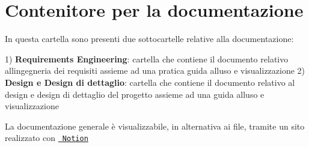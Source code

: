 \chapter{Contenitore per la documentazione}
\hypertarget{md_docs_2readme}{}\label{md_docs_2readme}
\label{md_docs_2readme_autotoc_md2}%
%


In questa cartella sono presenti due sottocartelle relative alla documentazione\+:

1) {\bfseries{Requirements Engineering}}\+: cartella che contiene il documento relativo all\textquotesingle{}ingegneria dei requisiti assieme ad una pratica guida all\textquotesingle{}uso e visualizzazione 2) {\bfseries{Design e Design di dettaglio}}\+: cartella che contiene il documento relativo al design e design di dettaglio del progetto assieme ad una guida all\textquotesingle{}uso e visualizzazione

La documentazione generale è visualizzabile, in alternativa ai file, tramite un sito realizzato con \href{https://www.notion.so/SOFTWARE-ENGINEERING-PROJECT-Gruppo-06-150521f00178803a86dcef575998703a}{\texttt{ Notion}} 